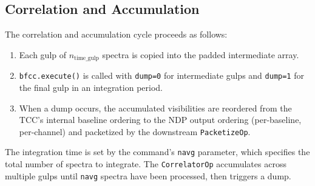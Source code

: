 \subsection{Correlation and Accumulation}

The correlation and accumulation cycle proceeds as follows:

\begin{enumerate}
    \item Each gulp of $n_\mathrm{time\_gulp}$ spectra is copied into the padded intermediate array.
    \item \texttt{bfcc.execute()} is called with \texttt{dump=0} for intermediate gulps and \texttt{dump=1} for the final gulp in an integration period.
    \item When a dump occurs, the accumulated visibilities are reordered from the TCC's internal baseline ordering to the NDP output ordering (per-baseline, per-channel) and packetized by the downstream \texttt{PacketizeOp}.
\end{enumerate}

The integration time is set by the  command's \texttt{navg} parameter, which specifies the total number of spectra to integrate.  The \texttt{CorrelatorOp} accumulates across multiple gulps until \texttt{navg} spectra have been processed, then triggers a dump.
